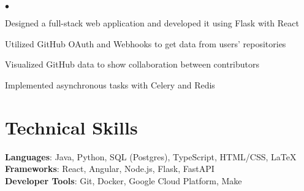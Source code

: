 \documentclass[margin, line]{res}
\newenvironment{list2}{
	\begin{list}{$\bullet$}{%
		\setlength{\itemsep}{0in}
		\setlength{\parsep}{0in} \setlength{\parskip}{0in}
		\setlength{\topsep}{0in} \setlength{\partopsep}{0in}
		\setlength{\leftmargin}{0.2in}}}{\end{list}}
\begin{document}
\begin{resume}
\begin{list2}
\item{Designed a full-stack web application and developed it using Flask with React}
\item{Utilized GitHub OAuth and Webhooks to get data from users' repositories}
\item{Visualized GitHub data to show collaboration between contributors}
\item{Implemented asynchronous tasks with Celery and Redis}
\end{list2}


\section{\sc Technical Skills}

\textbf{Languages}{: Java, Python, SQL (Postgres), TypeScript, HTML/CSS, \LaTeX} \\
\textbf{Frameworks}{: React, Angular, Node.js, Flask, FastAPI} \\
\textbf{Developer Tools}{: Git, Docker, Google Cloud Platform, Make} \\


\vspace{0.2in}

\end{resume}
\end{document}
